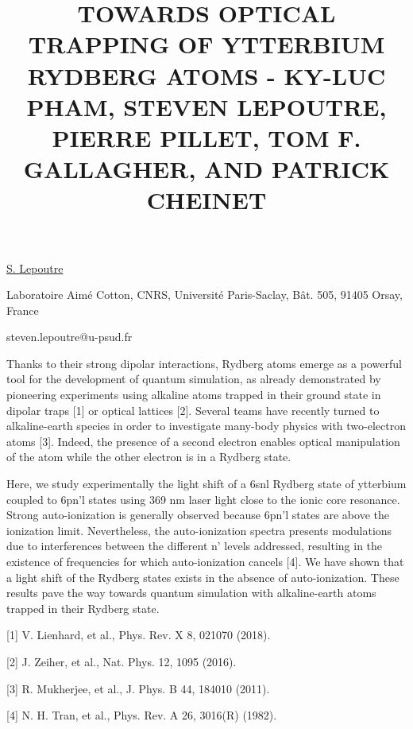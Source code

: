 \title{TOWARDS OPTICAL TRAPPING OF YTTERBIUM RYDBERG ATOMS - KY-LUC PHAM, STEVEN LEPOUTRE, PIERRE PILLET, TOM F. GALLAGHER, AND PATRICK CHEINET}

\underline{S. Lepoutre}  

{\normalsize{\vspace{-4mm}
Laboratoire Aim\'e Cotton, CNRS, Universit\'e Paris-Saclay, B\^at. 505, 91405 Orsay, France



\email steven.lepoutre@u-psud.fr}}

Thanks to their strong dipolar interactions, Rydberg atoms emerge as a powerful tool for the development of quantum simulation, as already demonstrated by pioneering experiments using alkaline atoms trapped in their ground state in dipolar traps [1] or optical lattices [2]. Several teams have recently turned to alkaline-earth species in order to investigate many-body physics with two-electron atoms [3]. Indeed, the presence of a second electron enables optical manipulation of the atom while the other electron is in a Rydberg state.

Here, we study experimentally the light shift of a 6snl Rydberg state of ytterbium coupled to 6pn’l states using 369 nm laser light close to the ionic core resonance. Strong auto-ionization is generally observed because 6pn’l states are above the ionization limit. Nevertheless, the auto-ionization spectra presents modulations due to interferences between the different n’ levels addressed, resulting in the existence of frequencies for which auto-ionization cancels [4]. We have shown that a light shift of the Rydberg states exists in the absence of auto-ionization. These results pave the way towards quantum simulation with alkaline-earth atoms trapped in their Rydberg state.

{\normalsize
[1] V. Lienhard, et al., Phys. Rev. X 8, 021070 (2018).
\vsp

[2] J. Zeiher, et al., Nat. Phys. 12, 1095 (2016).
\vsp

[3] R. Mukherjee, et al., J. Phys. B 44, 184010 (2011).
\vsp

[4] N. H. Tran, et al., Phys. Rev. A 26, 3016(R) (1982).
}


\vspace{\baselineskip}